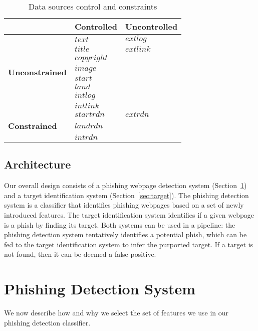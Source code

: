 \documentclass[10pt,conference,compsocconf,letterpaper]{IEEEtran}
\begin{document}
\iffullversion
 \begin{table}[tbh]
 \centering
 \caption{Data sources control and constraints}
 \label{tab:set_constraints}
 \begin{tabular}{l l l}
 								& \textbf{Controlled} & \textbf{Uncontrolled} \\ \hline
 \multirow{8}{*}{\textbf{Unconstrained}} & $text$ & $extlog$ \\
 								& $title$ & $extlink$ \\
 								& $copyright$  & \\
 								& $image$ & \\ 
 								& $start$ & \\
 								& $land$ & \\
 								& $intlog$ & \\
 								& $intlink$ & \\ \hline								
 								& $startrdn$ & $extrdn$ \\
 \textbf{Constrained}	& $landrdn$ & \\
 								& $intrdn$ & \\								
 
 \end{tabular}
 \end{table}
 \fi

\subsection{Architecture}
Our overall design consists of a phishing webpage detection system (Section~\ref{sec:classification}) and a target identification system (Section~\ref{sec:target}). The phishing detection system is a classifier that identifies phishing webpages based on a set of newly introduced features. The target identification system identifies if a given webpage is a phish by finding its target. Both systems can be used in a pipeline: the phishing detection system tentatively identifies a potential phish, which can be fed to the target identification system to infer the purported target.
\iffeateval
If a target is not found, then it can be deemed a false positive.
\fi
\section{Phishing Detection System}
\label{sec:classification}

\iffeateval
We now describe how and why we select the set of features we use in our phishing detection classifier.
\fi
  
\end{document}
